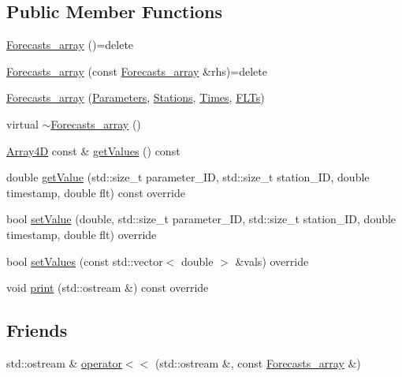 \subsection*{Public Member Functions}
\begin{DoxyCompactItemize}
\item 
\mbox{\hyperlink{class_forecasts__array_a0158e2c3e0b874c81131cd61d6184ee6}{Forecasts\+\_\+array}} ()=delete
\item 
\mbox{\hyperlink{class_forecasts__array_a46a39594c6bc4f9b08ef3ff752147695}{Forecasts\+\_\+array}} (const \mbox{\hyperlink{class_forecasts__array}{Forecasts\+\_\+array}} \&rhs)=delete
\item 
\mbox{\hyperlink{class_forecasts__array_a248f861bf586b980c61b25cfce16a3c4}{Forecasts\+\_\+array}} (\mbox{\hyperlink{class_parameters}{Parameters}}, \mbox{\hyperlink{class_stations}{Stations}}, \mbox{\hyperlink{class_times}{Times}}, \mbox{\hyperlink{class_f_l_ts}{F\+L\+Ts}})
\item 
virtual \mbox{\hyperlink{class_forecasts__array_a7e13cb82b1ab76a45946cff992c7fff4}{$\sim$\+Forecasts\+\_\+array}} ()
\item 
\mbox{\hyperlink{class_array4_d}{Array4D}} const  \& \mbox{\hyperlink{class_forecasts__array_afd9f8bb1e1736bf3665073d95ae5ef8c}{get\+Values}} () const
\item 
double \mbox{\hyperlink{class_forecasts__array_a38f7b890af0947e0d2022ce5bc5bb514}{get\+Value}} (std\+::size\+\_\+t parameter\+\_\+\+ID, std\+::size\+\_\+t station\+\_\+\+ID, double timestamp, double flt) const override
\item 
bool \mbox{\hyperlink{class_forecasts__array_a3b5557b58352d846c4fddc095f87589d}{set\+Value}} (double, std\+::size\+\_\+t parameter\+\_\+\+ID, std\+::size\+\_\+t station\+\_\+\+ID, double timestamp, double flt) override
\item 
bool \mbox{\hyperlink{class_forecasts__array_aba3f3632244ddb18c0b8a3fa0ee86981}{set\+Values}} (const std\+::vector$<$ double $>$ \&vals) override
\item 
void \mbox{\hyperlink{class_forecasts__array_a56985347f516340034b29dc4cdda87b1}{print}} (std\+::ostream \&) const override
\end{DoxyCompactItemize}
\subsection*{Friends}
\begin{DoxyCompactItemize}
\item 
std\+::ostream \& \mbox{\hyperlink{class_forecasts__array_a6bde933a6e00ad1328f834e4f5d98606}{operator$<$$<$}} (std\+::ostream \&, const \mbox{\hyperlink{class_forecasts__array}{Forecasts\+\_\+array}} \&)
\end{DoxyCompactItemize}
